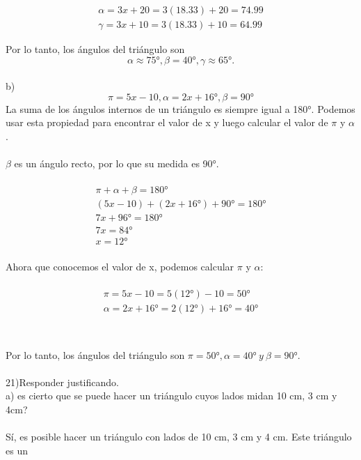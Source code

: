 \documentclass{article}
\begin{document}
\begin{equation}
\begin{array}{l}
\alpha = 3x + 20 = 3(18.33) + 20 = 74.99 \\
\gamma = 3x + 10 = 3(18.33) + 10 = 64.99
\end{array}
\end{equation}

Por lo tanto, los ángulos del triángulo son 
\[
\alpha \approx 75°, \beta = 40° , \gamma \approx 65°.
\]
\\
b)  
\[
\pi = 5x-10 ,  \alpha = 2x+16°, \beta=90°
\]
La suma de los ángulos internos de un triángulo es siempre igual a 180°. Podemos usar esta propiedad para encontrar el valor de x y luego calcular el valor de $\pi$ y $\alpha$.\\
\\
$\beta$ es un ángulo recto, por lo que su medida es 90°.\\
\\
\begin{equation}
\begin{array}{l}
\pi + \alpha + \beta = 180°\\
(5x - 10) + (2x + 16°) + 90° = 180°\\
7x + 96° = 180°\\
7x = 84°\\
x = 12°
\end{array}
\end{equation}
\\
Ahora que conocemos el valor de x, podemos calcular $\pi$ y $\alpha$:\\
\\
\begin{equation}
\begin{array}{l}
\pi = 5x - 10 = 5(12°) - 10 = 50°\\
\alpha = 2x + 16° = 2(12°) + 16° = 40°\\
\end{array}
\end{equation}
\\
\\
Por lo tanto, los ángulos del triángulo son $\pi = 50°, \alpha = 40°\ y\ \beta = 90°$.\\
\\
21)Responder justificando.\\
a) es cierto que se puede hacer un triángulo cuyos lados midan 10 cm, 3 cm y 4cm?\\
\\
Sí, es posible hacer un triángulo con lados de 10 cm, 3 cm y 4 cm. Este triángulo es un\\
\end{document}

